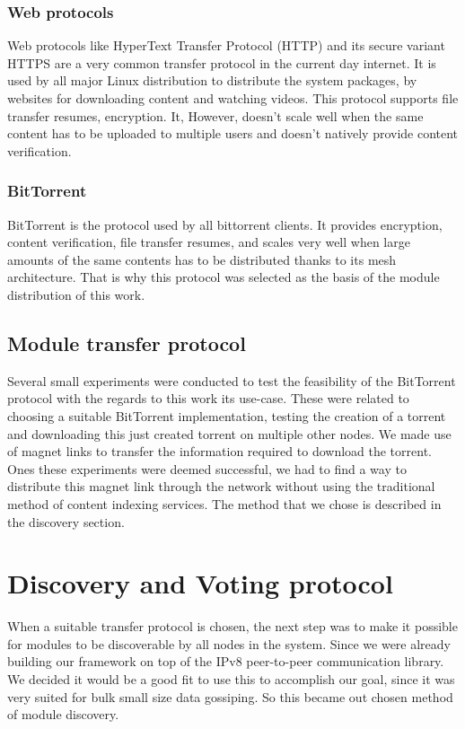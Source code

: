 \subsubsection{\textbf{Web protocols}}

Web protocols like HyperText Transfer Protocol (HTTP) and its secure variant HTTPS are a very common transfer protocol in the current day internet. It is used by all major Linux distribution to distribute the system packages, by websites for downloading content and watching videos. This protocol supports file transfer resumes, encryption. It, However, doesn't scale well when the same content has to be uploaded to multiple users and doesn't natively provide content verification.

\subsubsection{\textbf{BitTorrent}}

BitTorrent is the protocol used by all bittorrent clients. It provides encryption, content verification, file transfer resumes, and scales very well when large amounts of the same contents has to be distributed thanks to its mesh architecture. That is why this protocol was selected as the basis of the module distribution of this work.

\subsection{Module transfer protocol}
Several small experiments were conducted to test the feasibility of the BitTorrent protocol with the regards to this work its use-case. These were related to choosing a suitable BitTorrent implementation, testing the creation of a torrent and downloading this just created torrent on multiple other nodes. We made use of magnet links to transfer the information required to download the torrent. Ones these experiments were deemed successful, we had to find a way to distribute this magnet link through the network without using the traditional method of content indexing services. The method that we chose is described in the discovery section.

\section{Discovery and Voting protocol}

When a suitable transfer protocol is chosen, the next step was to make it possible for modules to be discoverable by all nodes in the system. Since we were already building our framework on top of the IPv8 peer-to-peer communication library. We decided it would be a good fit to use this to accomplish our goal, since it was very suited for bulk small size data gossiping. So this became out chosen method of module discovery.

